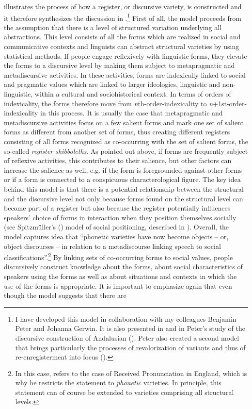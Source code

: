  illustrates the process of how a register, or discursive variety, is constructed and it therefore synthesizes the discussion in .\footnote{I have developed this model in collaboration with my colleagues Benjamin Peter and Johanna Gerwin. It is also presented in \citet{Paulsenforthcoming} and in Peter’s study of the discursive construction of Andalusian (\citeyear[116]{Peter2020}). Peter also created a second model that brings particularly the processes of revalorization of variants and thus of re-enregisterment into focus (\citeyear[157]{Peter2020}).} First of all, the model proceeds from the assumption that there is a level of structured variation underlying all abstractions. This level consists of all the forms which are realized in social and communicative contexts and linguists can abstract structural varieties by using statistical methods. If people engage reflexively with linguistic forms, they elevate the forms to a discursive level by making them subject to metapragmatic and metadiscursive activities. In these activities, forms are indexically linked to social and pragmatic values which are linked to larger ideologies, linguistic and non-linguistic, within a cultural and sociohistorical context. In terms of orders of indexicality, the forms therefore move from \emph{n}th-order-indexicality to \emph{n}+1st-order-indexicality in this process. It is usually the case that metapragmatic and metadiscursive activities focus on a few salient forms and mark one set of salient forms as different from another set of forms, thus creating different registers consisting of all forms recognized as co-occurring with the set of salient forms, the so-called \textit{register shibboleths}. As pointed out above, if forms are frequently subject of reflexive activities, this contributes to their salience, but other factors can increase the salience as well, e.g. if the form is foregrounded against other forms or if a form is connected to a conspicuous characterological figure. The key idea behind this model is that there is a potential relationship between the structural and the discursive level not only because forms found on the structural level can become part of a register but also because the register potentially influences speakers’ choice of forms in interaction when they position themselves socially (see Spitzmüller’s (\citeyear{Spitzmuller2013, Spitzmuller2015}) model of social positioning, described in ). Overall, the model captures  idea that “phonetic varieties have now become objects – or, object discourses – in relation to a metadiscourse linking speech to social classifications”.\footnote{In this case, \citet{Agha2003} refers to the case of Received Pronunciation in England, which is why he restricts the statement to \emph{phonetic} varieties. In principle, this statement can of course be extended to varieties comprising all structural levels.} By linking sets of co-occurring forms to social values, people discursively construct knowledge about the forms, about social characteristics of speakers using the forms as well as about situations and contexts in which the use of the forms is appropriate. It is important to emphasize again that even though the model suggests that there are 